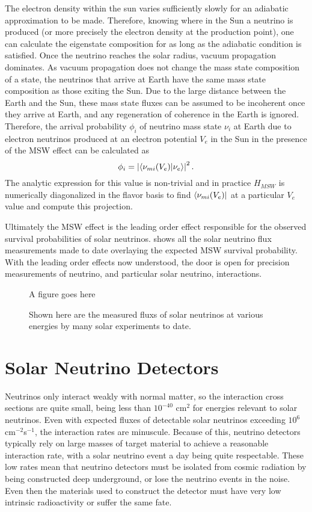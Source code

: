 The electron density within the sun varies sufficiently slowly for an adiabatic approximation to be made.
Therefore, knowing where in the Sun a neutrino is produced (or more precisely the electron density at the production point), one can calculate the eigenstate composition for as long as the adiabatic condition is satisfied.
Once the neutrino reaches the solar radius, vacuum propagation dominates. 
As vacuum propagation does not change the mass state composition of a state, the neutrinos that arrive at Earth have the same mass state composition as those exiting the Sun.
Due to the large distance between the Earth and the Sun, these mass state fluxes can be assumed to be incoherent once they arrive at Earth, and any regeneration of coherence in the Earth is ignored.
Therefore, the arrival probability $\phi_i$ of neutrino mass state $\nu_i$ at Earth due to electron neutrinos produced at an electron potential $V_e$ in the Sun in the presence of the MSW effect can be calculated as
\begin{equation}
\phi_i = \left| \braket{\nu_{m i}(V_e)}{\nu_e} \right|^2.
\label{rawflux}
\end{equation}
The analytic expression for this value is non-trivial and in practice $H_{MSW}$ is numerically diagonalized in the flavor basis to find $\bra{\nu_{m i}(V_e)}$ at a particular $V_e$ value and compute this projection.

Ultimately the MSW effect is the leading order effect responsible for the observed survival probabilities of solar neutrinos.
 shows all the solar neutrino flux measurements made to date overlaying the expected MSW survival probability.
With the leading order effects now understood, the door is open for precision measurements of neutrino, and particular solar neutrino, interactions.

\begin{figure}
\centering
A figure goes here
\caption{\label{fig:global_solar}Shown here are the measured fluxs of solar neutrinos at various energies by many solar experiments to date.}
\end{figure}

\chapter{Solar Neutrino Detectors}
\label{ch:detectors}

Neutrinos only interact weakly with normal matter, so the interaction cross sections are quite small, being less than $10^{-40}$ cm$^2$ for energies relevant to solar neutrinos.
Even with expected fluxes of detectable solar neutrinos exceeding $10^6$ cm$^{-2}$s$^{-1}$, the interaction rates are minuscule.
Because of this, neutrino detectors typically rely on large masses of target material to achieve a reasonable interaction rate, with a solar neutrino event a day being quite respectable.
These low rates mean that neutrino detectors must be isolated from cosmic radiation by being constructed deep underground, or lose the neutrino events in the noise.
Even then the materials used to construct the detector must have very low intrinsic radioactivity or suffer the same fate.

